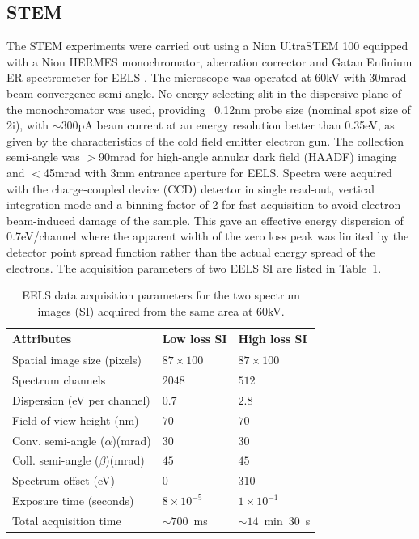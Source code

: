 \documentclass[%
aip,
rsi,%
 amsmath,amssymb,%
 reprint,%
]{revtex4-1}
\begin{document}
\subsection{STEM}
\label{sec:STEM}
The STEM experiments were carried out using a Nion UltraSTEM 100 equipped with a Nion HERMES monochromator, aberration corrector and Gatan Enfinium ER spectrometer for EELS \cite{Krivanek2013,Krivanek2015}. The microscope was operated at 60kV with 30mrad beam convergence semi-angle. No energy-selecting slit in the dispersive plane of the monochromator was used, providing  ~0.12nm probe size (nominal spot size of 2i), with $\sim$300pA beam current at an energy resolution better than 0.35eV, as given by the characteristics of the cold field emitter electron gun. The collection semi-angle was $>$90mrad for high-angle annular dark field (HAADF) imaging and $<$45mrad with 3mm entrance aperture for EELS. Spectra were acquired with the charge-coupled device (CCD) detector in single read-out, vertical integration mode and a binning factor of 2 for fast acquisition to avoid electron beam-induced damage of the sample. This gave an effective energy dispersion of 0.7eV/channel where the apparent width of the zero loss peak was limited by the detector point spread function rather than the actual energy spread of the electrons. The acquisition parameters of two EELS SI are listed in Table~\ref{tab:Attributes}.
\begin{table}%
	\caption{EELS data acquisition parameters for the two spectrum images (SI) acquired from the same area at $60$kV.}
    \label{tab:Attributes}
	\begin{ruledtabular}
		\begin{tabular}{lll}
			Attributes&Low loss SI&High loss SI							\\ \hline
			Spatial image size (pixels)&$87\times100$&$87\times100$ 	\\
            Spectrum channels		&$2048$&$512$						\\
			Dispersion (eV per channel)&$0.7$&$2.8$						\\
			Field of view height (nm) &$70$&$70$						\\
			Conv. semi-angle ($\alpha$)(mrad)&$30$&$30$					\\
			Coll. semi-angle ($\beta$)(mrad)&$45$&$45$					\\
			Spectrum offset (eV)&$0$&$310$								\\
			Exposure time (seconds)&$8\times10^{-5}$&$1\times10^{-1}$	\\
			Total acquisition time &$\sim700$~ms&$\sim14$~min~$30$~s
		\end{tabular}
	\end{ruledtabular}
\end{table}
\end{document}

